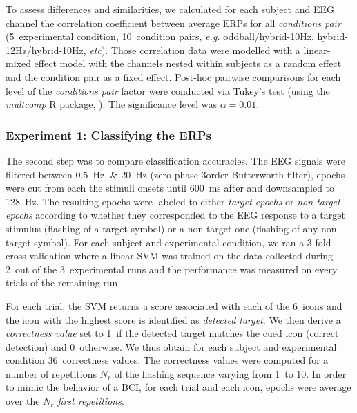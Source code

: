 \documentclass[10pt]{article}
\begin{document}
        To assess differences and similarities, we calculated for each subject and EEG channel the correlation coefficient between average ERPs for all \emph{conditions pair} (5~experimental condition, 10~condition pairs, \emph{e.g.} oddball/hybrid-10Hz, hybrid-12Hz/hybrid-10Hz, \emph{etc}).
        Those correlation data were modelled with a linear-mixed effect model with the channels nested within subjects as a random effect and the condition pair as a fixed effect.
        Post-hoc pairwise comparisons for each level of the \emph{conditions pair} factor were conducted via Tukey's test (using the \emph{multcomp} R package, \cite{multcomp2008}).
        The significance level was $\alpha = 0.01$.

        \subsubsection{Experiment 1: Classifying the \acsp{ERP}}
        \label{sec:2.3.1AnalysisExp1bis}

        The second step was to compare classification accuracies.
        The \ac{EEG} signals were filtered between \SIlist[list-units = single]{0.5;20}{\Hz} (zero-phase 3\rd order Butterworth filter), epochs were cut from each the stimuli onsets until \SI{600}{\ms} after and downsampled to \SI{128}{\Hz}.
        The resulting epochs were labeled to either \emph{target epochs} or \emph{non-target epochs} according to whether they corresponded to the \ac{EEG} response to a target stimulus (flashing of a target symbol) or a non-target one (flashing of any non-target symbol).
        For each subject and experimental condition, we ran a 3-fold cross-validation where a linear \ac{SVM} was trained \parencite{Keerthi2006} on the data collected during 2~out of the 3~experimental runs and the performance was measured on every trials of the remaining run.

        For each trial, the \ac{SVM} returns a score associated with each of the 6~icons and the icon with the highest score is identified as \emph{detected target}.
        We then derive a \emph{correctness value} set to 1~if the detected target matches the cued icon (correct detection) and 0~otherwise.
        We thus obtain for each subject and experimental condition 36~correctness values.
        The correctness values were computed for a number of repetitions $N_r$ of the flashing sequence varying from 1~to 10.
        In order to mimic the behavior of a \ac{BCI}, for each trial and each icon, epochs were average over the \emph{$N_r$ first repetitions}.
\end{document}
